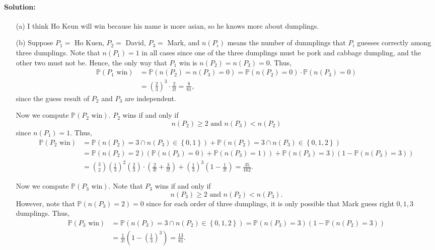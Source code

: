 \documentclass[a4paper,12pt]{article}
\begin{document}
\paragraph{Solution:}
\begin{itemize}
	\item [(a)] I think Ho Keun will win because his name is more asian, so he knows more about dumplings. 
	\item [(b)] Suppose \(P_1 = \) Ho Kuen, \(P_2 = \) David, \(P_3 = \) Mark, and \(n(P_i)\) means the number of dunmplings that \(P_i\) guesses correctly among three dumplings. Note that \(n(P_1) = 1\) in all cases since one of the three dumplings must be pork and cabbage dumpling, and the other two must not be. Hence, the only way that \(P_1\) win is \(n(P_2) = n(P_3) = 0\). Thus,
	\begin{align*}
		\mathbb{P} (P_1 \text{ win} ) &= \mathbb{P} (n(P_2) = n(P_3) = 0) = \mathbb{P} (n(P_2) = 0) \cdot \mathbb{P} (n(P_3) = 0) \\
		&= \left( \frac{2}{3} \right)^3 \cdot \frac{2}{3!} = \frac{8}{81}, 
	\end{align*}
	since the guess result of \(P_2\) and \(P_3\) are independent. 
	
	Now we compute \(\mathbb{P} (P_2 \text{ win} )\). \(P_2\) wins if and only if
	\[
		n(P_2) \ge 2 \text{ and } n(P_3) < n(P_2) 
	\] 
	since \(n(P_1) = 1\). Thus, 
	\begin{align*}
		\mathbb{P} (P_2 \text{ win}) &= \mathbb{P} (n(P_2) = 3 \cap n(P_3) \in \left\{ 0, 1 \right\} ) + \mathbb{P} (n(P_2) = 3 \cap n(P_3) \in \left\{ 0, 1, 2 \right\} ) \\
		&= \mathbb{P} (n(P_2) = 2) \left( \mathbb{P} (n(P_3) = 0) + \mathbb{P} (n(P_3) = 1) \right) + \mathbb{P} (n(P_3) = 3) (1 - \mathbb{P} (n(P_3) = 3)) \\
		&= \binom{3}{2} \left( \frac{1}{3} \right)^2 \left( \frac{2}{3} \right) \cdot \left( \frac{2}{3!} + \frac{3}{3!} \right) + \left( \frac{1}{3} \right)^3 \left( 1 - \frac{1}{3!} \right) = \frac{35}{162}.      
	\end{align*} 

	Now we compute \(\mathbb{P} (P_3 \text{ win} )\). Note that \(P_3\) wins if and only if 
	\[
		n(P_3) \ge 2 \text{ and }  n(P_2) < n(P_3).
	\]     
	However, note that \(\mathbb{P} (n(P_3) = 2) = 0\) since for each order of three dumplings, it is only possible that Mark guess right \(0, 1, 3\) dumplings. Thus,
	\begin{align*}
		\mathbb{P} (P_3 \text{ win} ) &=  \mathbb{P} (n(P_3) = 3 \cap n(P_2) \in \left\{ 0, 1, 2 \right\} ) = \mathbb{P} (n(P_3) = 3) \left( 1 - \mathbb{P} (n(P_2) = 3) \right) \\
		&= \frac{1}{3!} \left( 1 - \left( \frac{1}{3} \right)^3  \right) = \frac{13}{81}. 
	\end{align*}  

\end{itemize}
\end{document}
